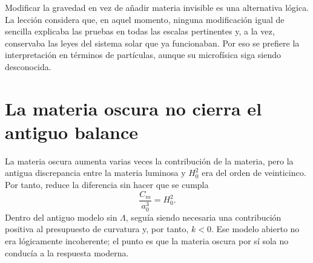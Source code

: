 \begin{classroomqa}
\end{classroomqa}

\begin{classroomqa}
\end{classroomqa}

Modificar la gravedad en vez de añadir materia invisible es una alternativa lógica. La lección considera que, en aquel momento, ninguna modificación igual de sencilla explicaba las pruebas en todas las escalas pertinentes y, a la vez, conservaba las leyes del sistema solar que ya funcionaban. Por eso se prefiere la interpretación en términos de partículas, aunque su microfísica siga siendo desconocida.

\section{La materia oscura no cierra el antiguo balance}

La materia oscura aumenta varias veces la contribución de la materia, pero la antigua discrepancia entre la materia luminosa y \(H_0^2\) era del orden de veinticinco. Por tanto, reduce la diferencia sin hacer que se cumpla
\begin{equation}
\frac{C_m}{a_0^3}=H_0^2.
\end{equation}
Dentro del antiguo modelo sin \(\Lambda\), seguía siendo necesaria una contribución positiva al presupuesto de curvatura y, por tanto, \(k<0\). Ese modelo abierto no era lógicamente incoherente; el punto es que la materia oscura por sí sola no conducía a la respuesta moderna.

